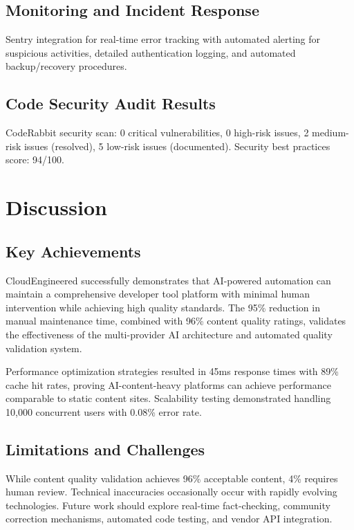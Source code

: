 \documentclass[conference]{IEEEtran}
\begin{document}
\subsection{Monitoring and Incident Response}

Sentry integration for real-time error tracking with automated alerting for suspicious activities, detailed authentication logging, and automated backup/recovery procedures.

\subsection{Code Security Audit Results}

CodeRabbit security scan: 0 critical vulnerabilities, 0 high-risk issues, 2 medium-risk issues (resolved), 5 low-risk issues (documented). Security best practices score: 94/100.

\section{Discussion}

\subsection{Key Achievements}

CloudEngineered successfully demonstrates that AI-powered automation can maintain a comprehensive developer tool platform with minimal human intervention while achieving high quality standards. The 95\% reduction in manual maintenance time, combined with 96\% content quality ratings, validates the effectiveness of the multi-provider AI architecture and automated quality validation system.

Performance optimization strategies resulted in 45ms response times with 89\% cache hit rates, proving AI-content-heavy platforms can achieve performance comparable to static content sites. Scalability testing demonstrated handling 10,000 concurrent users with 0.08\% error rate.

\subsection{Limitations and Challenges}

While content quality validation achieves 96\% acceptable content, 4\% requires human review. Technical inaccuracies occasionally occur with rapidly evolving technologies. Future work should explore real-time fact-checking, community correction mechanisms, automated code testing, and vendor API integration.
\end{document}
